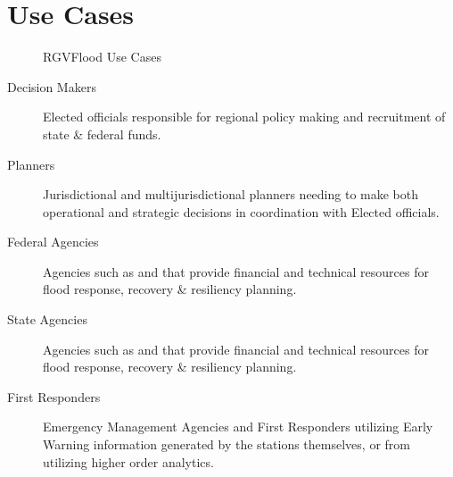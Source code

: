 \documentclass[letterpaper,10pt,english]{sphinxmanual}
\begin{document}
\section{Use Cases}
\label{\detokenize{predevelopment/use-cases/use-cases:use-cases}}\label{\detokenize{predevelopment/use-cases/use-cases::doc}}
\begin{figure}[htbp]
\centering
\capstart

\noindent{}
\caption{RGVFlood Use Cases}\label{\detokenize{predevelopment/use-cases/use-cases:id1}}\end{figure}
\begin{description}
\item[{Decision Makers}] \leavevmode
\sphinxAtStartPar
Elected officials responsible for regional policy making and recruitment of state \& federal funds.

\item[{Planners}] \leavevmode
\sphinxAtStartPar
Jurisdictional and multi\sphinxhyphen{}jurisdictional planners needing to make both operational and strategic decisions in coordination with Elected officials.

\item[{Federal Agencies}] \leavevmode
\sphinxAtStartPar
Agencies such as {\hyperref[\detokenize{glossary:term-FEMA}]{}} and {\hyperref[\detokenize{glossary:term-NWS}]{}} that provide financial and technical resources for flood response, recovery \& resiliency planning.

\item[{State Agencies}] \leavevmode
\sphinxAtStartPar
Agencies such as {\hyperref[\detokenize{glossary:term-TGLO}]{}} and {\hyperref[\detokenize{glossary:term-TWDB}]{}} that provide financial and technical resources for flood response, recovery \& resiliency planning.

\item[{First Responders}] \leavevmode
\sphinxAtStartPar
Emergency Management Agencies and First Responders utilizing Early Warning information generated by the {\hyperref[\detokenize{glossary:term-RTHS}]{}} stations themselves, or from {\hyperref[\detokenize{glossary:term-REON.cc}]{}} utilizing higher order analytics.


\end{description}
\end{document}
